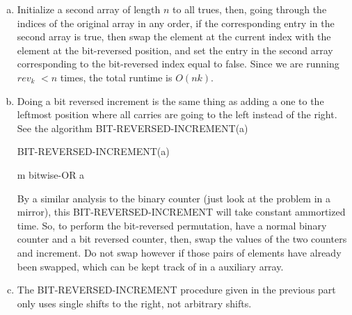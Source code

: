 \documentclass{article}
\begin{document}
\begin{enumerate}[a.]
\item
Initialize a second array of length $n$ to all trues, then, going through the indices of the original array in any order, if  the corresponding entry in the second array is true, then swap the element at the current index with the element at the bit-reversed position, and set the entry in the second array corresponding to the bit-reversed index equal to false. Since we are running $rev_k$ $< n$ times, the total runtime is $O(nk)$.
\item
Doing a bit reversed increment is the same thing as adding a one to the leftmost position where all carries are going to the left instead of the right. See the algorithm BIT-REVERSED-INCREMENT(a)

\begin{algorithm}
\caption{BIT-REVERSED-INCREMENT(a)}
\begin{algorithmic}
\EndWhile
\Return m bitwise-OR a
\end{algorithmic}
\end{algorithm}

By a similar analysis to the binary counter (just look at the problem in a mirror), this BIT-REVERSED-INCREMENT will take constant ammortized time. So, to perform the bit-reversed permutation, have a normal binary counter and a bit reversed counter, then, swap the values of the two counters and increment. Do not swap however if those pairs of elements have already been swapped, which can be kept track of in a auxiliary array.

\item The BIT-REVERSED-INCREMENT procedure given in the previous part only uses single shifts to the right, not arbitrary shifts.

\end{enumerate}
\end{document}
